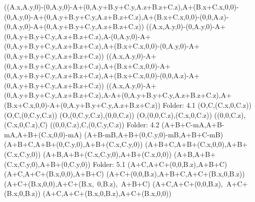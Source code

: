 \left(\left(A.x,A.y,0\right)-\left(0,A.y,0\right)-A+\left(0,A.y+B.y+C.y,A.z+B.z+C.z\right),A+\left(B.x+C.x,0,0\right)-\left(0,A.y,0\right)-A+\left(0,A.y+B.y+C.y,A.z+B.z+C.z\right),A+\left(B.x+C.x,0,0\right)-\left(0,0,A.z\right)-\left(0,A.y,0\right)-A+\left(0,A.y+B.y+C.y,A.z+B.z+C.z\right)\right)
\left(\left(A.x,A.y,0\right)-\left(0,A.y,0\right)-A+\left(0,A.y+B.y+C.y,A.z+B.z+C.z\right),A-\left(0,A.y,0\right)-A+\left(0,A.y+B.y+C.y,A.z+B.z+C.z\right),A+\left(B.x+C.x,0,0\right)-\left(0,A.y,0\right)-A+\left(0,A.y+B.y+C.y,A.z+B.z+C.z\right)\right)
\left(\left(A.x,A.y,0\right)-A+\left(0,A.y+B.y+C.y,A.z+B.z+C.z\right),A+\left(B.x+C.x,0,0\right)-A+\left(0,A.y+B.y+C.y,A.z+B.z+C.z\right),A+\left(B.x+C.x,0,0\right)-\left(0,0,A.z\right)-A+\left(0,A.y+B.y+C.y,A.z+B.z+C.z\right)\right)
\left(\left(A.x,A.y,0\right)-A+\left(0,A.y+B.y+C.y,A.z+B.z+C.z\right),A-A+\left(0,A.y+B.y+C.y,A.z+B.z+C.z\right),A+\left(B.x+C.x,0,0\right)-A+\left(0,A.y+B.y+C.y,A.z+B.z+C.z\right)\right)
Folder: 4.1
\left(O,C,\left(C.x,0,C.z\right)\right)
\left(O,C,\left(0,C.y,C.z\right)\right)
\left(O,\left(0,C.y,C.z\right),\left(0,0,C.z\right)\right)
\left(O,\left(0,0,C.z\right),\left(C.x,0,C.z\right)\right)
\left(\left(0,0,C.z\right),\left(C.x,0,C.z\right),C\right)
\left(\left(0,0,C.z\right),C,\left(0,C.y,C.z\right)\right)
Folder: 4.2
\left(A+B+C-mA,A+B-mA,A+B+\left(C.x,0,0\right)-mA\right)
\left(A+B-mB,A+B+\left(0,C.y,0\right)-mB,A+B+C-mB\right)
\left(A+B+C,A+B+\left(0,C.y,0\right),A+B+\left(C.x,C.y,0\right)\right)
\left(A+B+C,A+B+\left(C.x,0,0\right),A+B+\left(C.x,C.y,0\right)\right)
\left(A+B,A+B+\left(C.x,C.y,0\right),A+B+\left(C.x,0,0\right)\right)
\left(A+B,A+B+\left(C.x,C.y,0\right),A+B+\left(0,C.y,0\right)\right)
Folder: 5.1
\left(A+C,A+C+\left(0,0,B.z\right),A+B+C\right)
\left(A+C,A+C+\left(B.x,0,0\right),A+B+C\right)
\left(A+C+\left(0,0,B.z\right),A+B+C,A+C+\left(B.x,0,B.z\right)\right)
\left(A+C+\left(B.x,0,0\right),A+C+\left(B.x,\ 0,B.z\right),\ A+B+C\right)
\left(A+C,A+C+\left(0,0,B.z\right),\ A+C+\left(B.x,0,B.z\right)\right)
\left(A+C,A+C+\left(B.x,0,B.z\right),A+C+\left(B.x,0,0\right)\right)
